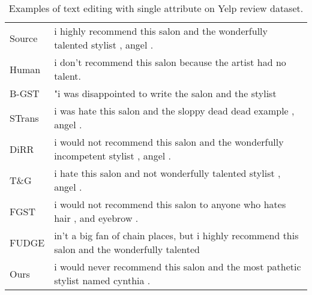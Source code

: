 \documentclass[11pt]{article}
\begin{document}
\begin{table}[ht]
\begin{tabular}{lp{13cm}}
Source&i highly recommend this salon and the wonderfully talented stylist , angel .\\
Human&i don't recommend this salon because the artist had no talent.\\
\midrule
B-GST&"i was disappointed to write the salon and the stylist \\
STrans&i was hate this salon and the sloppy dead dead example , angel .\\
DiRR&i would not recommend this salon and the wonderfully incompetent stylist , angel .\\
T\&G&i hate this salon and not wonderfully talented stylist , angel .\\
FGST&i would not recommend this salon to anyone who hates hair , and eyebrow .\\
\midrule
FUDGE&in't a big fan of chain places, but i highly recommend this salon and the wonderfully talented\\
Ours&i would never recommend this salon and the most pathetic stylist named cynthia .\\
\bottomrule
    \end{tabular}
    \vspace{-5pt}
    \caption{Examples of text editing with single attribute on Yelp review dataset. 
}
    \label{tab:example_tst_yelp_single}
\end{table}
\end{document}
